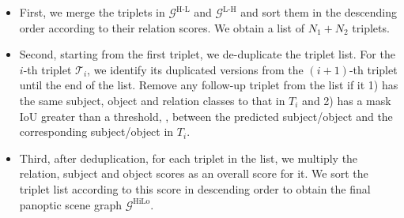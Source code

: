 \begin{itemize}
\item  First, we merge the triplets in $\mathcal G^\text{H-L}$ and $\mathcal G^\text{L-H}$ and sort them in the descending order according to their relation scores. We obtain a list of $N_{1} + N_{2}$ triplets.  

\item Second, starting from the first triplet, we de-duplicate the triplet list. For the $i$-th triplet $\mathcal T_i$, we identify its duplicated versions from the $(i+1)$-th triplet until the end of the list.  
Remove any follow-up triplet from the list if it 1) has the same subject, object and relation classes to that in $T_i$ and 2) has a mask IoU greater than a threshold, , between the predicted subject/object and the corresponding subject/object in $T_i$.

\item Third, after deduplication, for each triplet in the list, we multiply the relation, subject and object scores as an overall score for it. We sort the  triplet list according to this score in descending order to obtain the final panoptic scene graph $\mathcal G^\text{HiLo}$.

\end{itemize}
